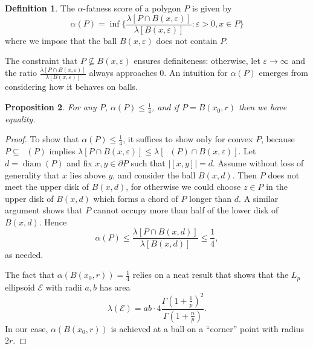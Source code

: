 \documentclass[draft]{jocg}
\newcommand{\EE}{\mathcal{E}}
\newcommand{\set}[1]{\{#1\}}
\newcommand{\abs}[1]{|#1|}
\DeclareMathOperator{\diam}{\mathrm{diam}}
\DeclareMathOperator{\conv}{\mathcal{}}
\newtheorem{proposition}{Proposition}[section]
\theoremstyle{definition}
\newtheorem{definition}[proposition]{Definition}
\theoremstyle{remark}
\begin{document}
\begin{definition}
  The $\alpha$-fatness score of a polygon $P$ is given by
  \begin{equation*}
    \alpha(P) = \inf\set{\frac{\lambda[P \cap B(x,
    \varepsilon)]}{\lambda[B(x,\varepsilon)]} : \varepsilon > 0, x \in P}
  \end{equation*}
  where we impose that the ball $B(x,\varepsilon)$
  does not contain $P$. 
  \label{def:alpha}
\end{definition}

The constraint that $P \not\subseteq B(x,\varepsilon)$ ensures definiteness:
otherwise, let $\varepsilon \to \infty$ and the ratio $\frac{\lambda[P \cap B(x,
\varepsilon)]}{\lambda[B(x, \varepsilon)]}$ always approaches $0$. An intuition
for $\alpha(P)$ emerges from considering how it behaves on balls.

\begin{proposition}
  For any $P$, $\alpha(P) \leq \frac{1}{4}$, and if $P = B(x_0, r)$
  then we have equality.
  \label{prop:alpha}
\end{proposition}

\begin{proof}
  To show that $\alpha(P) \leq \frac{1}{4}$, it suffices to show only for convex
  $P$, because $P \subseteq \conv(P)$ implies $\lambda[P \cap B(x, \varepsilon)]
  \leq \lambda[\conv(P) \cap B(x, \varepsilon)]$. Let $d = \diam (P)$ and fix
  $x,y \in \partial P$ such that $\abs{[x,y]} = d$. Assume without loss of
  generality that $x$ lies above $y$, and consider the ball $B(x, d)$. Then $P$
  does not meet the upper disk of $B(x,d)$, for otherwise we could choose $z \in
  P$ in the upper disk of $B(x,d)$ which forms a chord of $P$ longer than $d$.
  A similar argument shows that $P$ cannot occupy more than half of the lower
  disk of $B(x,d)$. Hence
  \begin{equation*}
    \alpha(P) \leq \frac{\lambda[P \cap B(x,d)]}{\lambda[B(x,d)]} \leq
    \frac{1}{4},
  \end{equation*}
  as needed.

  The fact that $\alpha(B(x_0, r)) = \frac{1}{4}$ relies on a neat
  result \cite{10.2307/30044198} that shows that the $L_p$
  ellipsoid $\EE$ with radii $a, b$ has area
  \begin{equation*}
    \lambda(\EE) = a b \cdot 4
    \frac{\Gamma(1+\frac{1}{p})^2}{\Gamma(1+\frac{n}{p})}.
  \end{equation*}
  In our case, $\alpha(B(x_0, r))$ is achieved at a ball on a ``corner'' point
  with radius $2r$.
\end{proof}
\end{document}
